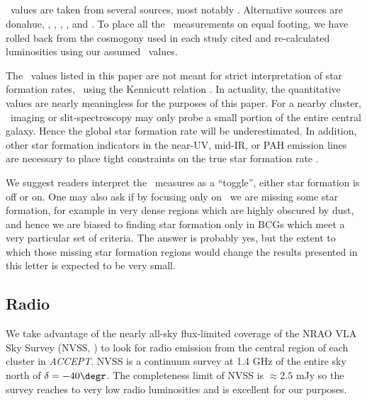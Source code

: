 \documentclass{emulateapj}
\newcommand{\accept}{\textit{ACCEPT}}
\begin{document}
\subsection{\halpha}
\label{sec:ha}

\halpha\ values are taken from several sources, most notably
\cite{1999MNRAS.306..857C}. Alternative sources are donahue,
\cite{ir_quillen}, \cite{heckman89}, \cite{1996ApJS..107..541L},
\cite{1997MNRAS.292..419W}, and \cite{2005MNRAS.363..216C}. To place
all the \halpha\ measurements on equal footing, we have rolled back
from the cosmogony used in each study cited and re-calculated \halpha
luminosities using our assumed \LCDM\ values.

The \halpha\ values listed in this paper are not meant for strict
interpretation of star formation rates, \eg\ using the Kennicutt
relation \citep{kennicuttrelation}. In actuality, the quantitative
values are nearly meaningless for the purposes of this paper. For a
nearby cluster, \halpha\ imaging or slit-spectroscopy may only probe a
small portion of the entire central galaxy. Hence the global star
formation rate will be underestimated. In addition, other star
formation indicators in the near-UV, mid-IR, or PAH emission lines are
necessary to place tight constraints on the true star formation rate
\citep{2007ApJ...666..870C}.

We suggest readers interpret the \halpha\ measures as a ``toggle'',
either star formation is off or on. One may also ask if by focusing
only on \halpha\ we are missing some star formation, for example in
very dense regions which are highly obscured by dust, and hence we are
biased to finding star formation only in BCGs which meet a very
particular set of criteria. The answer is probably yes, but the extent
to which those missing star formation regions would change the results
presented in this letter is expected to be very small. 

\subsection{Radio}
\label{sec:radio}

We take advantage of the nearly all-sky flux-limited coverage of the
NRAO VLA Sky Survey (NVSS, \citealt{1998AJ....115.1693C}) to look for
radio emission from the central region of each cluster in
\accept. NVSS is a continuum survey at 1.4 GHz of the entire sky north
of $\delta = -40\degr$. The completeness limit of NVSS is $\approx
2.5$ mJy so the survey reaches to very low radio luminosities and is
excellent for our purposes.
\end{document}
